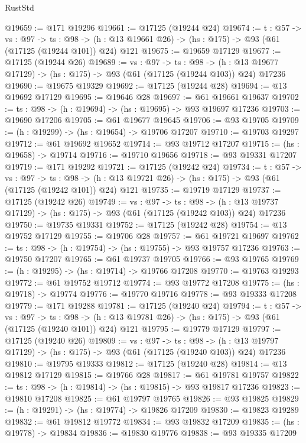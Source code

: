 \begin{lexlean}{RustStd}
\begin{coremodule}
@19659 := @171 @19296
@19661 := @17125 (@19244 @24)
@19674 := {t : @57} ->
  {vs : @97} ->
  {ts : @98} -> (h : @13 @19661 @26) -> (hs : @175) -> @93 (@61 (@17125 (@19244 @101)) @24) @121
@19675 := @19659 @17129
@19677 := @17125 (@19244 @26)
@19689 := {vs : @97} ->
  {ts : @98} ->
  (h : @13 @19677 @17129) -> (hs : @175) -> @93 (@61 (@17125 (@19244 @103)) @24) @17236
@19690 := @19675 @19329
@19692 := @17125 (@19244 @28)
@19694 := @13 @19692 @17129
@19695 := @19646 @28
@19697 := @61 @19661 @19637
@19702 := {ts : @98} -> (h : @19694) -> (hs : @19695) -> @93 @19697 @17236
@19703 := @19690 @17206
@19705 := @61 @19677 @19645
@19706 := @93 @19705
@19709 := (h : @19299) -> (hs : @19654) -> @19706 @17207
@19710 := @19703 @19297
@19712 := @61 @19692 @19652
@19714 := @93 @19712 @17207
@19715 := (hs : @19658) -> @19714
@19716 := @19710 @19656
@19718 := @93 @19331 @17207
@19719 := @171 @19292
@19721 := @17125 (@19242 @24)
@19734 := {t : @57} ->
  {vs : @97} ->
  {ts : @98} -> (h : @13 @19721 @26) -> (hs : @175) -> @93 (@61 (@17125 (@19242 @101)) @24) @121
@19735 := @19719 @17129
@19737 := @17125 (@19242 @26)
@19749 := {vs : @97} ->
  {ts : @98} ->
  (h : @13 @19737 @17129) -> (hs : @175) -> @93 (@61 (@17125 (@19242 @103)) @24) @17236
@19750 := @19735 @19331
@19752 := @17125 (@19242 @28)
@19754 := @13 @19752 @17129
@19755 := @19706 @28
@19757 := @61 @19721 @19697
@19762 := {ts : @98} -> (h : @19754) -> (hs : @19755) -> @93 @19757 @17236
@19763 := @19750 @17207
@19765 := @61 @19737 @19705
@19766 := @93 @19765
@19769 := (h : @19295) -> (hs : @19714) -> @19766 @17208
@19770 := @19763 @19293
@19772 := @61 @19752 @19712
@19774 := @93 @19772 @17208
@19775 := (hs : @19718) -> @19774
@19776 := @19770 @19716
@19778 := @93 @19333 @17208
@19779 := @171 @19288
@19781 := @17125 (@19240 @24)
@19794 := {t : @57} ->
  {vs : @97} ->
  {ts : @98} -> (h : @13 @19781 @26) -> (hs : @175) -> @93 (@61 (@17125 (@19240 @101)) @24) @121
@19795 := @19779 @17129
@19797 := @17125 (@19240 @26)
@19809 := {vs : @97} ->
  {ts : @98} ->
  (h : @13 @19797 @17129) -> (hs : @175) -> @93 (@61 (@17125 (@19240 @103)) @24) @17236
@19810 := @19795 @19333
@19812 := @17125 (@19240 @28)
@19814 := @13 @19812 @17129
@19815 := @19766 @28
@19817 := @61 @19781 @19757
@19822 := {ts : @98} -> (h : @19814) -> (hs : @19815) -> @93 @19817 @17236
@19823 := @19810 @17208
@19825 := @61 @19797 @19765
@19826 := @93 @19825
@19829 := (h : @19291) -> (hs : @19774) -> @19826 @17209
@19830 := @19823 @19289
@19832 := @61 @19812 @19772
@19834 := @93 @19832 @17209
@19835 := (hs : @19778) -> @19834
@19836 := @19830 @19776
@19838 := @93 @19335 @17209

\end{coremodule}
\end{lexlean}

